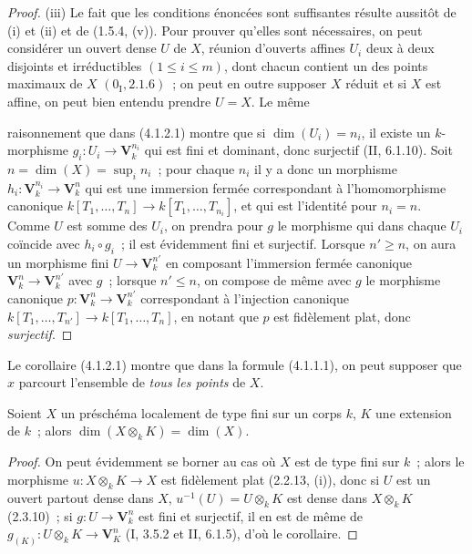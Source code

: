 \begin{proof}
(iii) Le fait que les conditions énoncées sont suffisantes résulte aussitôt de
(i) et (ii) et de (1.5.4, (v)). Pour prouver qu'elles sont nécessaires, on peut
considérer un ouvert dense $U$ de $X$, réunion d'ouverts affines $U_i$ deux à
deux disjoints et irréductibles $(1\leqslant i\leqslant m)$, dont chacun
contient un des points maximaux de $X$ $(0_{\mathrm I},2.1.6)$~; on peut en
outre supposer $X$ réduit et si $X$ est affine, on peut bien entendu prendre
$U=X$. Le même


raisonnement que dans (4.1.2.1) montre que si $\dim(U_i)=n_i$, il existe un
$k$-morphisme $g_i:U_i\to\mathbf V_k^{n_i}$ qui est fini et dominant, donc
surjectif (II, 6.1.10). Soit $n=\dim(X)=\sup_i n_i$~; pour chaque $n_i$ il y a
donc un morphisme $h_i:\mathbf V_k^{n_i}\to\mathbf V_k^n$ qui est une
immersion fermée correspondant à l'homomorphisme canonique
$k[T_1,\ldots,T_n]\to k[T_1,\ldots,T_{n_i}]$, et qui est l'identité pour
$n_i=n$. Comme $U$ est somme des $U_i$, on prendra pour $g$ le morphisme qui
dans chaque $U_i$ coïncide avec $h_i\circ g_i$~; il est évidemment fini et
surjectif. Lorsque $n'\geqslant n$, on aura un morphisme fini
$U\to\mathbf V_k^{n'}$ en composant l'immersion fermée canonique
$\mathbf V_k^n\to\mathbf V_k^{n'}$ avec $g$~; lorsque $n'\leqslant n$, on
compose de même avec $g$ le morphisme canonique
$p:\mathbf V_k^n\to\mathbf V_k^{n'}$ correspondant à l'injection canonique
$k[T_1,\ldots,T_{n'}]\to k[T_1,\ldots,T_n]$, en notant que $p$ est fidèlement
plat, donc \emph{surjectif}.
\end{proof}

\begin{remark}[4.1.3]
\label{IV.2.4.1.3-fr}
Le corollaire (4.1.2.1) montre que dans la formule (4.1.1.1), on peut supposer
que $x$ parcourt l'ensemble de \emph{tous les points} de $X$.
\end{remark}

\begin{corollary}[4.1.4]
\label{IV.2.4.1.4-fr}
Soient $X$ un préschéma localement de type fini sur un corps $k$, $K$ une
extension de $k$~; alors $\dim(X\otimes_k K)=\dim(X)$.
\end{corollary}

\begin{proof}
On peut évidemment se borner au cas où $X$ est de type fini sur $k$~; alors le
morphisme $u:X\otimes_k K\to X$ est fidèlement plat (2.2.13, (i)), donc si
$U$ est un ouvert partout dense dans $X$, $u^{-1}(U)=U\otimes_k K$ est dense
dans $X\otimes_k K$ (2.3.10)~; si $g:U\to\mathbf V_k^n$ est fini et
surjectif, il en est de même de
$g_{(K)}:U\otimes_k K\to\mathbf V_K^n$ (I, 3.5.2 et II, 6.1.5), d'où le
corollaire.
\end{proof}

